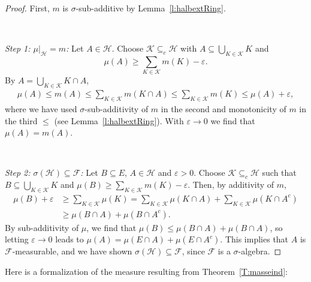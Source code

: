 \documentclass[lean]{AFM}
\begin{document}
\begin{proof}
  First, $m$ is $\sigma$-sub-additive by
  Lemma~\ref{l:halbextRing}.

  ~

  \noindent\emph{Step 1: $\mu|_{\mathcal H} = m$:} Let $A\in\mathcal
  H$. Choose $\mathcal K \subseteq_c \mathcal H$ with
  $A\subseteq \bigcup_{K\in\mathcal K} K$ and
  $$\mu(A) \geq \sum_{K\in\mathcal K} m(K) - \varepsilon.$$ By $ A =
  \bigcup_{K\in\mathcal K} K\cap A$,
  \begin{align*}
    \mu(A) \leq m(A) \leq \sum_{K\in\mathcal K} m(K\cap A) \leq
    \sum_{K\in\mathcal K} m(K) \leq \mu(A) + \varepsilon,
  \end{align*}
  where we have used $\sigma$-sub-additivity of $m$ in the second and
  monotonicity of $m$ in the third $\leq$ (see
  Lemma~\ref{l:halbextRing}).  With $\varepsilon\to 0$ we find that
  $\mu(A) = m(A)$.

  ~

  \noindent\emph{Step 2: $\sigma(\mathcal H)\subseteq \mathcal F$:}
  Let $B \subseteq E$, $A\in\mathcal H$ and $\varepsilon>0$. Choose
  $\mathcal K \subseteq_c \mathcal H$ such that $B \subseteq
  \bigcup_{K \in \mathcal K} K$ and $\mu(B) \geq \sum_{K\in\mathcal K}
  m(K) - \varepsilon.$ Then, by additivity of $m$,
  \begin{align*}
    \mu(B)+\varepsilon & \geq \sum_{K\in\mathcal K} \mu(K) =
    \sum_{K\in\mathcal K} \mu(K\cap A) + \sum_{K\in\mathcal K}
    \mu(K\cap A^c) \\ & \geq \mu(B\cap A) + \mu(B\cap A^c).
  \end{align*}
  By sub-additivity of $\mu$, we find that $\mu(B) \leq \mu(B\cap A) +
  \mu(B \cap A)$, so letting $\varepsilon\to 0$ leads to $\mu(A) =
  \mu(E\cap A) + \mu(E\cap A^c)$. This implies that $A$ is $\mathcal
  F$-measurable, and we have shown $\sigma(\mathcal H) \subseteq
  \mathcal F$, since $\mathcal F$ is a $\sigma$-algebra.
\end{proof}

\noindent
Here is a formalization of the measure resulting from
Theorem~\ref{T:masseind}:

\end{document}
